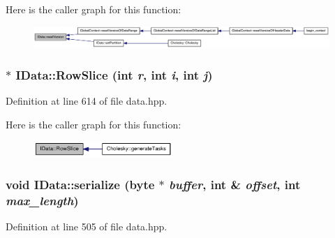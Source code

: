 Here is the caller graph for this function:\nopagebreak
\begin{figure}[H]
\begin{center}
\leavevmode
\includegraphics[width=420pt]{class_i_data_ae8281ff366e454072b7b1f95034ac7b9_icgraph}
\end{center}
\end{figure}
\hypertarget{class_i_data_aeb28080b1fd90c8b6260b1bfce948b47}{
\subsubsection[{RowSlice}]{$\ast$ IData::RowSlice (int {\em r}, \/  int {\em i}, \/  int {\em j})}}
\label{class_i_data_aeb28080b1fd90c8b6260b1bfce948b47}


Definition at line 614 of file data.hpp.

Here is the caller graph for this function:\nopagebreak
\begin{figure}[H]
\begin{center}
\leavevmode
\includegraphics[width=149pt]{class_i_data_aeb28080b1fd90c8b6260b1bfce948b47_icgraph}
\end{center}
\end{figure}
\hypertarget{class_i_data_a4c6b52cc869cd389399fd4d9ac9b3979}{
\subsubsection[{serialize}]{\setlength{\rightskip}{0pt plus 5cm}void IData::serialize ({\bf byte} $\ast$ {\em buffer}, \/  int \& {\em offset}, \/  int {\em max\_\-length})}}
\label{class_i_data_a4c6b52cc869cd389399fd4d9ac9b3979}


Definition at line 505 of file data.hpp.

